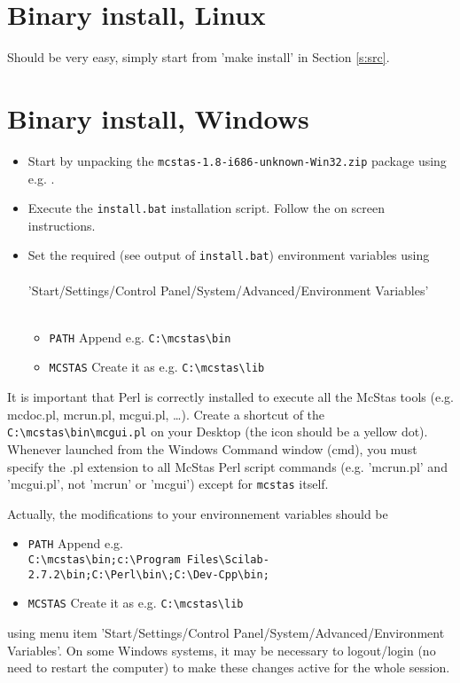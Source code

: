 \section{Binary install, Linux}
\label{s:linbin}
Should be very easy, simply start from 'make install' in Section \ref{s:src}.

\section{Binary install, Windows}
\label{s:winbin}
\begin{itemize}
\item{Start by unpacking the \texttt{mcstas-1.8-i686-unknown-Win32.zip} package using
e.g. .}
\item{Execute the \texttt{install.bat} installation script. Follow the
  on screen instructions.}
\item{Set the required (see output of \texttt{install.bat}) environment variables using
\\\ \\
\noindent 'Start/Settings/Control Panel/System/Advanced/Environment
Variables'\\\
  \begin{itemize}
    \item{\verb+PATH+ Append e.g. \verb+C:\mcstas\bin+}
    \item{\verb+MCSTAS+ Create it as e.g. \verb+C:\mcstas\lib+}
  \end{itemize}}
\end{itemize}
It is important that Perl is correctly installed to execute all the McStas tools (e.g. mcdoc.pl, mcrun.pl, mcgui.pl, \ldots). Create a shortcut of the \verb+C:\mcstas\bin\mcgui.pl+ on your Desktop (the icon should be a yellow dot). Whenever launched from the Windows Command window (cmd), you must specify the .pl extension to all McStas Perl script commands (e.g. 'mcrun.pl' and 'mcgui.pl', not 'mcrun' or 'mcgui') except for \verb+mcstas+ itself.

Actually, the modifications to your environnement variables should be
\begin{itemize}
    \item{\verb+PATH+ Append e.g. \\
    \verb+C:\mcstas\bin;c:\Program Files\Scilab-2.7.2\bin;C:\Perl\bin\;C:\Dev-Cpp\bin;+}
    \item{\verb+MCSTAS+ Create it as e.g. \verb+C:\mcstas\lib+}
\end{itemize}
using menu item 'Start/Settings/Control Panel/System/Advanced/Environment Variables'. On some Windows systems, it may be necessary to logout/login (no need to restart the computer) to make these changes active for the whole session.

